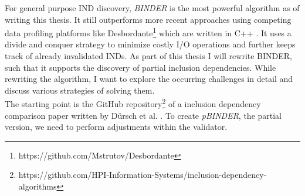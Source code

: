 For general purpose IND discovery, \textit{BINDER} \cite{papenbrock2015divide}
is the most powerful algorithm as of writing this thesis. It still outperforms more recent approaches using competing data profiling platforms like Desbordante\footnote{https://github.com/Mstrutov/Desbordante} which are written in C++ \cite{smirnov2023fast}. It uses a divide and conquer strategy to minimize costly I/O operations and further keeps track of already invalidated INDs. As part of this thesis I will rewrite BINDER, such that it supports the discovery of partial inclusion dependencies. While rewriting the algorithm, I want to explore the occurring challenges in detail and discuss various strategies of solving them. \\
The starting point is the GitHub repository\footnote{https://github.com/HPI-Information-Systems/inclusion-dependency-algorithms} of a inclusion dependency comparison paper written by Dürsch et al. \cite{dursch2019inclusion}. To create \textit{pBINDER}, the partial version, we need to perform adjustments within the validator.